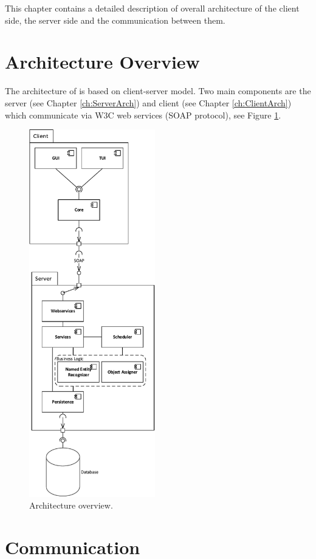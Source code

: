 
This chapter contains a detailed description of overall architecture of the client
side, the server side and the communication between them. 

\section{Architecture Overview}

The architecture of \textan{} is based on client-server model. Two main components
are the \textan{} server (see Chapter \ref{ch:ServerArch}) and \textan{} client 
(see Chapter \ref{ch:ClientArch}) which communicate via W3C web services
(SOAP protocol), see Figure \ref{fig:Architecture}.

\begin{figure}[!htb]
        \centering
        \includegraphics[height=16cm]{Images/Architecture}
        \caption{Architecture overview.}
        \label{fig:Architecture}
\end{figure}

\section{Communication}
\label{sec:Communication}

